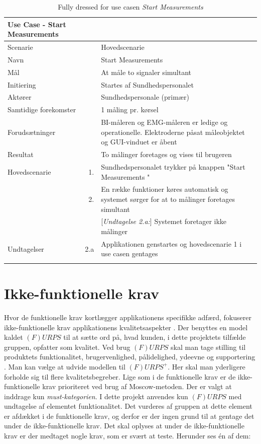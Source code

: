 \begin{longtabu} to  %
	{\large \textbf{Use Case - Start Measurements }} && \\
	\toprule
	Scenarie 				&&	Hovedscenarie\\
	Navn 					&& 	Start Measurements\\
	Mål 					&& 	At måle to signaler simultant \\
	Initiering 				&& 	Startes af Sundhedspersonalet\\
	Aktører 				&& 	Sundhedspersonale (primær)\\
	
	Samtidige forekomster  	&& 	1 måling pr. kørsel \\
	Forudsætninger 			&&	BI-måleren og EMG-måleren er ledige og operationelle. Elektroderne påsat måleobjektet og GUI-vinduet er åbent \\ 
	Resultat 				&& 	To målinger foretages og vises til brugeren\\ \midrule
	Hovedscenarie 			&    1. 	&	Sundhedspersonalet trykker på knappen "Start Measurements "\\				 	
							&    2. 	& 	En række funktioner køres automatisk og systemet sørger for at to målinger foretages simultant\\
	
	
	&&[\textit{Undtagelse 2.a:}] Systemet foretager ikke målinger\\ \midrule						
							
							
	Undtagelser 			&		2.a	& 	Applikationen genstartes og hovedscenarie 1 i use casen gentages \\ \bottomrule
	
	\caption{Fully dressed for use casen \textit{Start Measurements}}
	\label{UC1}
\end{longtabu}

\pagebreak
\section{Ikke-funktionelle krav}

Hvor de funktionelle krav kortlægger applikationens specifikke adfærd, fokuserer ikke-funktionelle krav applikationens kvalitetsaspekter \cite{ISELektioner}.
Der benyttes en model kaldet $(F)URPS$ til at sætte ord på, hvad kunden, i dette projektets tilfælde gruppen, opfatter som kvalitet. Ved brug $(F)URPS$ skal man tage stilling til produktets funktionalitet, brugervenlighed, pålidelighed, ydeevne og supportering \cite{ISELektioner}. Man kan vælge at udvide  modellen til  $(F)URPS^{+}$. Her skal man yderligere forholde sig til flere kvalitetsbegreber. Lige som i de funktionelle krav er de ikke-funktionelle krav prioriteret ved brug af Moscow-metoden. Der er valgt at inddrage kun \textit{must-kategorien}. I dette projekt anvendes kun $(F)URPS$ med undtagelse af  elementet funktionalitet. Det vurderes af gruppen at  dette element er afdækket i de funktionelle krav, og derfor er der ingen grund til at gentage det under de ikke-funktionelle krav. Det skal oplyses at under de ikke-funktionelle krav er der medtaget nogle krav, som er svært at teste. Herunder ses én af dem:


